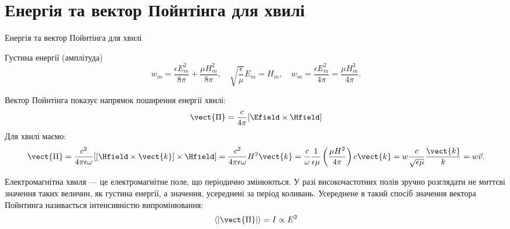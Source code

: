 \documentclass[onlytextwidth]{beamer}
\begin{document}
\section{Енергія та вектор Пойнтінга для хвилі}





\begin{frame}{Енергія та вектор Пойнтінга для хвилі}{}
	\begin{block}{}\justifying

		Густина енергії (амплітуда)
		\begin{equation*}
			w_m = \frac{\epsilon E_m^2}{8\pi} + \frac{\mu H_m^2}{8\pi}, \quad  \sqrt{\frac{\epsilon}{\mu}} E_m = H_m, \quad w_m = \frac{\epsilon
				E_m^2}{4\pi} = \frac{\mu H_m^2}{4\pi}.
		\end{equation*}
	\end{block}
	\begin{block}{}\justifying
		Вектор Пойнтінга показує напрямок поширення енергії хвилі:
		\begin{equation*}
			\vect{\Pi} = \frac{c}{4\pi}[\Efield\times\Hfield]
		\end{equation*}
		Для хвилі маємо:
		\begin{equation*}
			\vect{\Pi} =  \frac{c^2}{4\pi\epsilon \omega} [[\Hfield\times\vect{k}]\times\Hfield] = \frac{c^2}{4\pi\epsilon \omega} H^2 \vect{k} =
			\frac{c}{\omega} \frac{1}{\epsilon\mu}\left( \frac{\mu H^2}{4\pi}\right)   c \vect{k} = w \frac{c}{\sqrt{\epsilon\mu}}
			\frac{\vect{k}}{k}= w
			\vec{v}.
		\end{equation*}
	\end{block}
	\begin{block}{}\justifying\small
		Електромагнітна хвиля --- це електромагнітне поле, що періодично змінюються. У разі високочастотних полів зручно розглядати не миттєві значення
		таких величин, як густина енергії, а значення, усереднені за період коливань. Усереднене в такий спосіб значення вектора Пойнтинга називається
		\alert{інтенсивністю випромінювання}:
		\begin{equation*}
			\left\langle |\vect{\Pi}| \right\rangle = I \propto E^2
		\end{equation*}
	\end{block}
\end{frame}
\end{document}
